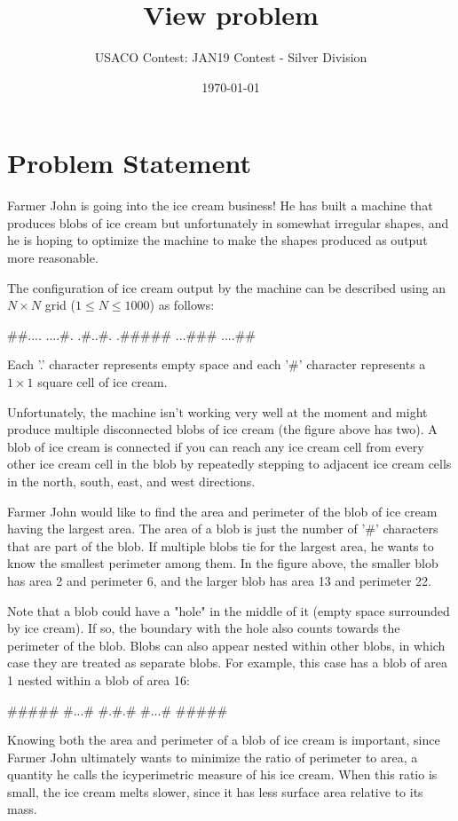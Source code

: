 \documentclass[12pt]{article}
\title{View problem}
\author{USACO Contest: JAN19 Contest - Silver Division}
\date{\today}
\begin{document}
\maketitle

\section*{Problem Statement}

Farmer John is going into the ice cream business!  He has built a machine that
produces blobs of ice cream but unfortunately in somewhat irregular  shapes, and
he is hoping to optimize the machine to make the shapes  produced as output more
reasonable.

The configuration of ice cream output by the machine can be described using an
$N \times N$ grid ($1 \leq N \leq 1000$) as follows:


##....
....#.
.#..#.
.#####
...###
....##

Each '.' character represents empty space and each '#' character represents a
$1 \times 1$ square cell of ice cream.  

Unfortunately, the machine isn't working very well at the moment and might
produce multiple disconnected blobs of ice cream (the figure above has two). A
blob of ice cream is connected if you can reach any ice cream cell from every
other ice cream cell in the blob by repeatedly stepping to adjacent ice cream
cells in the north, south, east, and west directions.  

Farmer John would like to find the area and perimeter of the blob of ice  cream
having the largest area.  The area of a blob is just the number of '#'
characters that are part of the blob. If multiple blobs tie for the largest
area, he wants to know the smallest perimeter among them.  In the figure above,
the smaller blob has area 2 and perimeter 6, and the larger blob has area 13 and
perimeter 22.  

Note that a blob could have a "hole" in the middle of it (empty space surrounded
by ice cream).  If so, the boundary with the hole also counts towards the
perimeter of the blob.  Blobs can also appear nested within other blobs, in
which case they are treated as separate blobs.  For example, this case has a
blob of area 1 nested within a blob of area 16:


#####
#...#
#.#.#
#...#
#####

Knowing both the area and perimeter of a blob of ice cream is important, since
Farmer John ultimately wants to minimize the ratio of perimeter to area, a 
quantity he calls the icyperimetric measure of his ice cream.  When this ratio
is small, the ice cream melts slower, since it has less surface area relative to
its mass.
\end{document}
